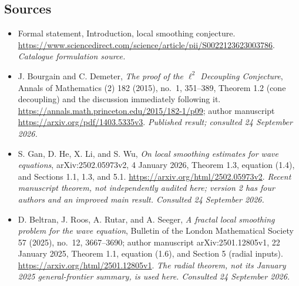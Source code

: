 \documentclass[11pt]{article}
\begin{document}
	\subsection{Sources}
	\begin{itemize}\raggedright
		\item[\textnormal{[S1]}]\hypertarget{source:30004844:1}{} Formal statement, Introduction, local smoothing conjecture.
		\url{https://www.sciencedirect.com/science/article/pii/S0022123623003786}.
		{\small\textit{Catalogue formulation source.}}
		\item[\textnormal{[E1]}]\hypertarget{extra:30004844:1}{}
		J. Bourgain and C. Demeter, \emph{The proof of the $\ell^2$ Decoupling
			Conjecture}, Annals of Mathematics (2) 182 (2015), no.~1, 351--389,
		Theorem 1.2 (cone decoupling) and the discussion immediately following it.
		\url{https://annals.math.princeton.edu/2015/182-1/p09};
		author manuscript \url{https://arxiv.org/pdf/1403.5335v3}.
		{\small\textit{Published result; consulted 24 September 2026.}}
		\item[\textnormal{[E2]}]\hypertarget{extra:30004844:2}{}
		S. Gan, D. He, X. Li, and S. Wu, \emph{On local smoothing estimates for
			wave equations}, arXiv:2502.05973v2, 4 January 2026, Theorem 1.3,
		equation (1.4), and Sections 1.1, 1.3, and 5.1.
		\url{https://arxiv.org/html/2502.05973v2}.
		{\small\textit{Recent manuscript theorem, not independently audited here;
				version 2 has four authors and an improved main result. Consulted
				24 September 2026.}}
		\item[\textnormal{[E3]}]\hypertarget{extra:30004844:3}{}
		D. Beltran, J. Roos, A. Rutar, and A. Seeger, \emph{A fractal local
			smoothing problem for the wave equation}, Bulletin of the London
		Mathematical Society 57 (2025), no.~12, 3667--3690; author manuscript
		arXiv:2501.12805v1, 22 January 2025, Theorem 1.1, equation (1.6),
		and Section 5 (radial inputs).
		\url{https://arxiv.org/html/2501.12805v1}.
		{\small\textit{The radial theorem, not its January 2025 general-frontier
				summary, is used here. Consulted 24 September 2026.}}
	\end{itemize}
	
\end{document}

